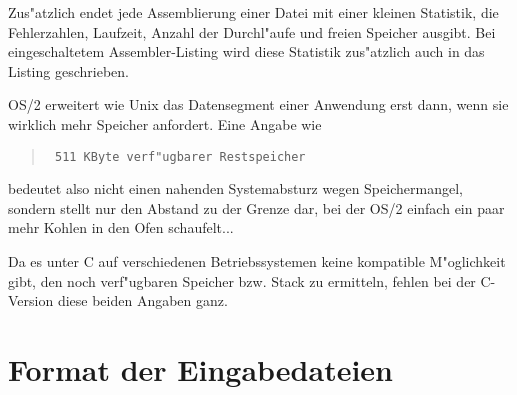 \documentclass[12pt,a4paper,twoside]{report}
\begin{document}
Zus"atzlich endet jede Assemblierung einer Datei mit einer kleinen
Statistik, die Fehlerzahlen, Laufzeit, Anzahl der Durchl"aufe und freien
Speicher ausgibt.  Bei eingeschaltetem Assembler-Listing wird diese
Statistik zus"atzlich auch in das Listing geschrieben.

OS/2  erweitert wie Unix das Datensegment einer
Anwendung erst dann, wenn sie wirklich mehr Speicher anfordert.  Eine
Angabe wie
\begin{quote}{\tt
511 KByte verf"ugbarer Restspeicher
}\end{quote}
bedeutet also nicht einen nahenden Systemabsturz wegen Speichermangel,
sondern stellt nur den Abstand zu der Grenze dar, bei der OS/2 einfach
ein paar mehr Kohlen in den Ofen schaufelt...

Da es unter C   auf verschiedenen Betriebssystemen
keine kompatible M"oglichkeit gibt, den noch verf"ugbaren Speicher bzw.
Stack zu ermitteln, fehlen bei der C-Version diese beiden Angaben ganz.


\section{Format der Eingabedateien}
\label{AttrTypes}
\end{document}
